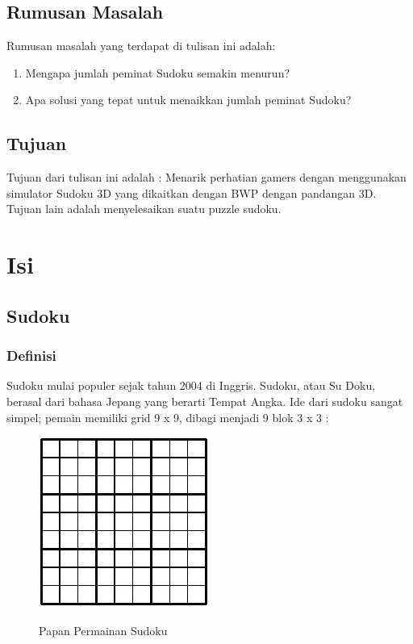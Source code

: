 \documentclass[11pt,a4paper]{report}
\begin{document}
\section{Rumusan Masalah}
Rumusan masalah yang terdapat di tulisan ini adalah:
\begin{enumerate}
	\item Mengapa jumlah peminat Sudoku semakin menurun?
	\item Apa solusi yang tepat untuk menaikkan jumlah peminat Sudoku?
\end{enumerate}

\section{Tujuan}
Tujuan dari tulisan ini adalah : Menarik perhatian gamers dengan menggunakan simulator Sudoku 3D yang dikaitkan dengan BWP dengan pandangan 3D. Tujuan lain adalah menyelesaikan suatu puzzle sudoku.

\chapter{Isi} %
\section{Sudoku}
\subsection{Definisi}
\indent Sudoku mulai populer sejak tahun 2004 di Inggris. Sudoku, atau Su Doku, berasal dari bahasa Jepang yang berarti Tempat Angka. Ide dari sudoku sangat simpel; pemain memiliki grid 9 x 9, dibagi menjadi 9 blok 3 x 3 :
\begin{figure}[h]
\centering
\includegraphics{sudoku}\\ \vspace{1cm}
\caption[Papan Permainan Sudoku]{Papan Permainan Sudoku} 
\end{figure}
\end{document}
